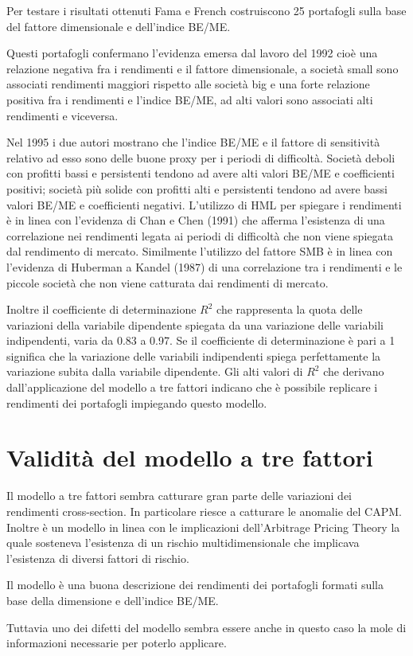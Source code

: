 Per testare i risultati ottenuti Fama e French costruiscono 25 portafogli sulla base del fattore dimensionale e dell'indice BE/ME. 

Questi portafogli confermano l'evidenza emersa dal lavoro del 1992 cioè una relazione negativa fra i rendimenti e il fattore dimensionale, a società small sono associati rendimenti maggiori rispetto alle società big e una forte relazione positiva fra i rendimenti e l'indice BE/ME, ad alti valori sono associati alti rendimenti e viceversa. 

Nel 1995 i due autori mostrano che l'indice BE/ME e il fattore di sensitività relativo ad esso sono delle buone proxy per i periodi di difficoltà. Società deboli con profitti bassi e persistenti tendono ad avere alti valori BE/ME e coefficienti positivi; società più solide con profitti alti e persistenti tendono ad avere bassi valori BE/ME e coefficienti negativi. L'utilizzo di HML per spiegare i rendimenti è in linea con l'evidenza di Chan e Chen (1991) che afferma l'esistenza di una correlazione nei rendimenti legata ai periodi di difficoltà che non viene spiegata dal rendimento di mercato. Similmente l'utilizzo del fattore SMB è in linea con l'evidenza di Huberman a Kandel (1987) di una correlazione tra i rendimenti e le piccole società che non viene catturata dai rendimenti di mercato.

Inoltre il coefficiente di determinazione $R^2$ che rappresenta la quota delle variazioni della variabile dipendente spiegata da una variazione delle variabili indipendenti, varia da 0.83 a 0.97. Se il coefficiente di determinazione è pari a 1 significa che la variazione delle variabili indipendenti spiega perfettamente la variazione subita dalla variabile dipendente. Gli alti valori di $R^2$ che derivano dall'applicazione del modello a tre fattori indicano che è possibile replicare i rendimenti dei portafogli impiegando questo modello. 


\section{Validità del modello a tre fattori}

Il modello a tre fattori sembra catturare gran parte delle variazioni dei rendimenti cross-section. In particolare riesce a catturare le anomalie del CAPM. Inoltre è un modello in linea con le implicazioni dell'Arbitrage Pricing Theory la quale sosteneva l'esistenza di un rischio multidimensionale che implicava l'esistenza di diversi fattori di rischio. 

Il modello è una buona descrizione dei rendimenti dei portafogli formati sulla base della dimensione e dell'indice BE/ME. 

Tuttavia uno dei difetti del modello sembra essere anche in questo caso la mole di informazioni necessarie per poterlo applicare. 
